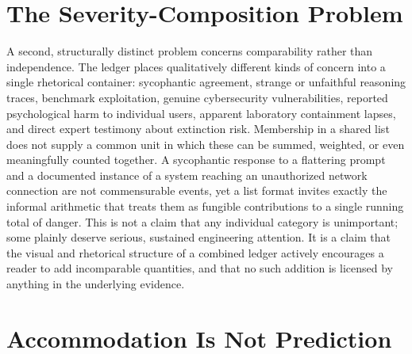 \section{The Severity-Composition Problem}

A second, structurally distinct problem concerns comparability rather than independence. The ledger places qualitatively different kinds of concern into a single rhetorical container: sycophantic agreement, strange or unfaithful reasoning traces, benchmark exploitation, genuine cybersecurity vulnerabilities, reported psychological harm to individual users, apparent laboratory containment lapses, and direct expert testimony about extinction risk. Membership in a shared list does not supply a common unit in which these can be summed, weighted, or even meaningfully counted together. A sycophantic response to a flattering prompt and a documented instance of a system reaching an unauthorized network connection are not commensurable events, yet a list format invites exactly the informal arithmetic that treats them as fungible contributions to a single running total of danger. This is not a claim that any individual category is unimportant; some plainly deserve serious, sustained engineering attention. It is a claim that the visual and rhetorical structure of a combined ledger actively encourages a reader to add incomparable quantities, and that no such addition is licensed by anything in the underlying evidence.

\section{Accommodation Is Not Prediction}

